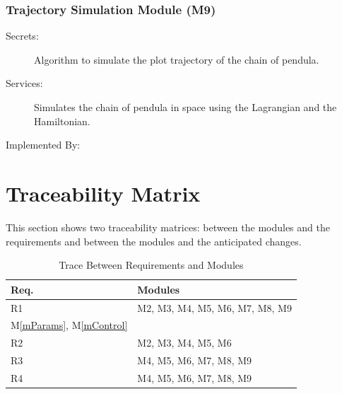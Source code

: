 \documentclass[12pt, titlepage]{article}
\newcommand{\mref}[1]{M\ref{#1}}
\begin{document}
\subsubsection{Trajectory Simulation Module (M9)}
\label{MG_SMHSim}
\begin{description}
\item[Secrets:] Algorithm to simulate the plot trajectory of the chain 
of pendula.
\item[Services:] Simulates the chain of pendula in space using the Lagrangian
and the Hamiltonian.
\item[Implemented By:] \progname{}
\end{description}

\section{Traceability Matrix} \label{SecTM}

This section shows two traceability matrices: between the modules and the
requirements and between the modules and the anticipated changes.

\begin{table}[H]
\centering
\begin{tabular}{p{} p{}}
\toprule
\textbf{Req.} & \textbf{Modules}\\
\midrule
R1 & M2, M3, M4, M5, M6, M7, M8, M9\\%
\mref{mParams}, \mref{mControl}\\
R2 & M2, M3, M4, M5, M6\\%
R3 & M4, M5, M6, M7, M8, M9\\%
R4 & M4, M5, M6, M7, M8, M9\\%
\bottomrule
\end{tabular}
\caption{Trace Between Requirements and Modules}
\label{TblRT}
\end{table}
\end{document}
